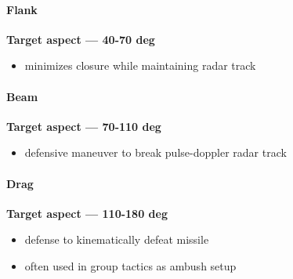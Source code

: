\paragraph{Flank}
\textbf{Target aspect --- 40-70 deg}
\begin{itemize}
    \item minimizes closure while maintaining radar track
\end{itemize}
\paragraph{Beam}
\textbf{Target aspect --- 70-110 deg}
\begin{itemize}
    \item defensive maneuver to break pulse-doppler radar track
\end{itemize}
\paragraph{Drag}
\textbf{Target aspect --- 110-180 deg}
\begin{itemize}
    \item defense to kinematically defeat missile
    \item often used in group tactics as ambush setup
\end{itemize}

